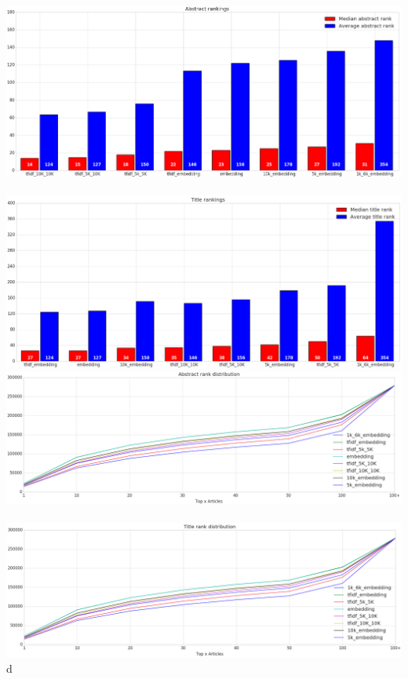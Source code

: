 \documentclass[../../Thesis.tex]{subfiles}
\begin{document}
\includegraphics[width=6in]{Plots/Abstract_rankings}\\
\\
\includegraphics[width=6in]{Plots/Title_rankings}\\
\includegraphics[width=6in]{Plots/Abstract_rank_distribution}\\
\\
\includegraphics[width=6in]{Plots/Title_rank_distribution}\\
d
\end{document}
